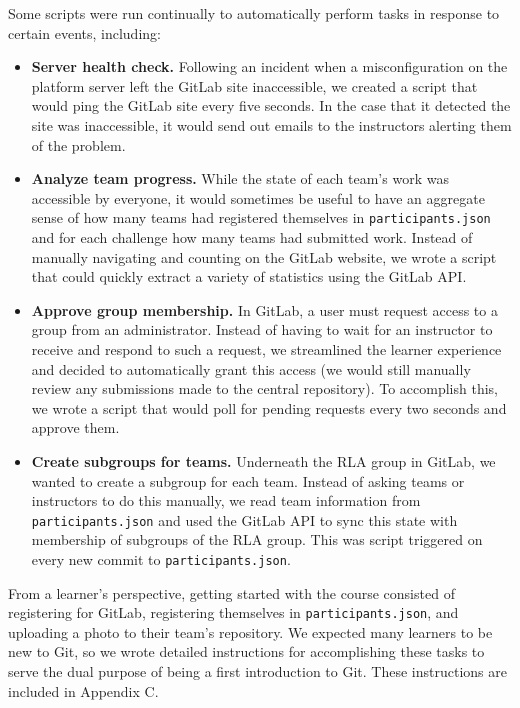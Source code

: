 \documentclass[12pt,twoside]{mitthesis}
\begin{document}
Some scripts were run continually to automatically perform tasks in response to certain events, including:
\begin{itemize}
\item \textbf{Server health check.} Following an incident when a misconfiguration on the platform server left the GitLab site inaccessible, we created a script that would ping the GitLab site every five seconds. In the case that it detected the site was inaccessible, it would send out emails to the instructors alerting them of the problem.
\item \textbf{Analyze team progress.} While the state of each team's work was accessible by everyone, it would sometimes be useful to have an aggregate sense of how many teams had registered themselves in \texttt{participants.json} and for each challenge how many teams had submitted work. Instead of manually navigating and counting on the GitLab website, we wrote a script that could quickly extract a variety of statistics using the GitLab API.
\item \textbf{Approve group membership.} In GitLab, a user must request access to a group from an administrator. Instead of having to wait for an instructor to receive and respond to such a request, we streamlined the learner experience and decided to automatically grant this access (we would still manually review any submissions made to the central repository). To accomplish this, we wrote a script that would poll for pending requests every two seconds and approve them. 
\item \textbf{Create subgroups for teams.} Underneath the RLA group in GitLab, we wanted to create a subgroup for each team. Instead of asking teams or instructors to do this manually, we read team information from \texttt{participants.json} and used the GitLab API to sync this state with membership of subgroups of the RLA group. This was script triggered on every new commit to \texttt{participants.json}.
\end{itemize}
From a learner's perspective, getting started with the course consisted of registering for GitLab, registering themselves in \texttt{participants.json}, and uploading a photo to their team's repository. We expected many learners to be new to Git, so we wrote detailed instructions for accomplishing these tasks to serve the dual purpose of being a first introduction to Git. These instructions are included in Appendix C.
\end{document}
